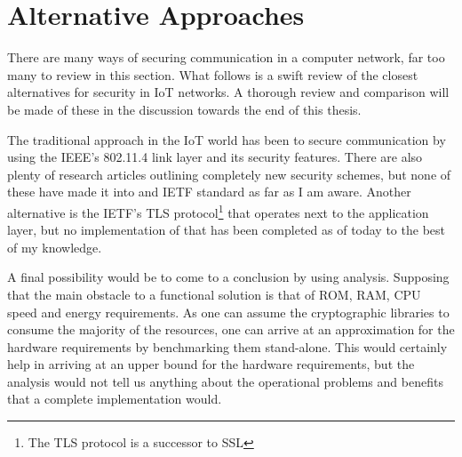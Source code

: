 \documentclass[final,a4paper,twoside,11pt,onecolumn]{report}
\begin{document}
\section{Alternative Approaches}
There are many ways of securing communication in a computer network, far too many to review in this section. What follows is a swift review of the closest alternatives for security in IoT networks. A thorough review and comparison will be made of these in the discussion towards the end of this thesis.

The traditional approach in the IoT world has been to secure communication by using the IEEE's 802.11.4 link layer and its security features. There are also plenty of research articles outlining completely new security schemes, but none of these have made it into and IETF standard as far as I am aware. Another alternative is the IETF's TLS protocol\footnote{The TLS protocol is a successor to SSL} that operates next to the application layer, but no implementation of that has been completed as of today to the best of my knowledge.

A final possibility would be to come to a conclusion by using analysis. Supposing that the main obstacle to a functional solution is that of ROM, RAM, CPU speed and energy requirements. As one can assume the cryptographic libraries to consume the majority of the resources, one can arrive at an approximation for the hardware requirements by benchmarking them stand-alone. This would certainly help in arriving at an upper bound for the hardware requirements, but the analysis would not tell us anything about the operational problems and benefits that a complete implementation would.


	
\end{document}
